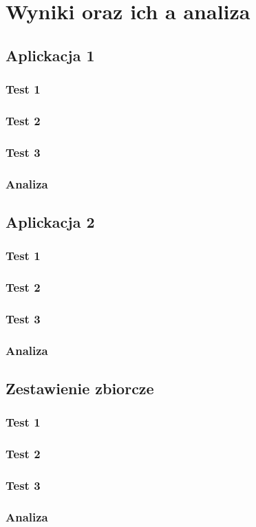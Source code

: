 \chapter{Wyniki oraz ich a analiza}

\section{Aplickacja 1}
\subsection{Test 1}
\subsection{Test 2}
\subsection{Test 3}
\subsection{Analiza}

\section{Aplickacja 2}
\subsection{Test 1}
\subsection{Test 2}
\subsection{Test 3}
\subsection{Analiza}

\section{Zestawienie zbiorcze}
\subsection{Test 1}
\subsection{Test 2}
\subsection{Test 3}
\subsection{Analiza}